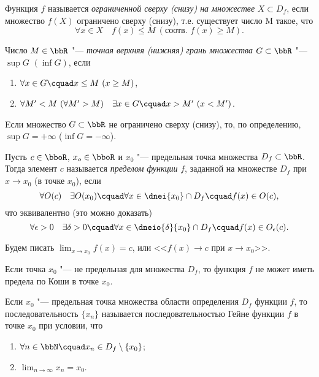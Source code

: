 \begin{defn}
Функция $f$ называется \textit{ограниченной сверху (снизу) на множестве} $X\subset D_f$, если множество $f(X)$ ограничено сверху (снизу), т.е. существует число M такое, что
$$
\forall x \in X \quad f(x) \le M \ (\text{соотв. } f(x)\ge M).
$$
\end{defn}

\begin{defn}
Число $M \in \bbR$ "--- \textit{точная верхняя (нижняя) грань множества} $G \subset \bbR$ "--- $\sup G$ $(\inf G)$, если 
\begin{enumerate}
\item
$\forall x \in G\cquad x \le M \ (x\ge M)$,
\item
$\forall M' < M \ (\forall M' > M)\quad \exists x\in G\cquad x>M' \ (x<M')$.
\end{enumerate}
\quad\textbullet\quad Eсли множество $G \subset \bbR$ не ограничено сверху (снизу), то, по определению, $\sup G=+\infty$ ($\inf G=-\infty$).  
\end{defn}

\begin{defn}\label{df:ch2:predelCaushi}
Пусть $c\in\bboR$, $x_o \in \bboR$ и $x_0$ "--- предельная точка множества $D_f \subset \bbR$. Тогда элемент $c$ называется \textit{пределом функции} $f$, заданной на множестве $D_f$ при $x \to x_0$ (в точке $x_0$), если
$$
\forall O(c)\quad \exists O(x_0)\cquad \forall x \in \dnei{x_0}\cap D_f\cquad f(x) \in O(c),
$$  
что эквивалентно (это можно доказать)
$$
\forall \epsilon > 0\quad \exists \delta >0\cquad \forall x \in \dneio{\delta}{x_0} \cap D_f\cquad f(x) \in O_\epsilon (c). 
$$

Будем писать $\lim_{x \to x_0}\limits f(x) = c$, или <<$f(x)\to c$ при $x \to x_0$>>.
\end{defn}
Если точка $x_0$ "--- не предельная для множества $D_f$, то функция $f$ не может иметь предела по Коши в точке $x_0$. %

\begin{defn}
Если $x_0$ "--- предельная точка множества области определения $D_f$ функции $f$, то последовательность $\{x_n\}$ называется последовательностью Гейне функции $f$ в точке $x_0$ при условии, что
\begin{enumerate}
\item $\forall n \in \bbN\cquad x_n\in D_f\setminus \{x_0\}$;
\item $\lim_{n \to \infty}\limits x_n = x_0$.
\end{enumerate}
\end{defn}

